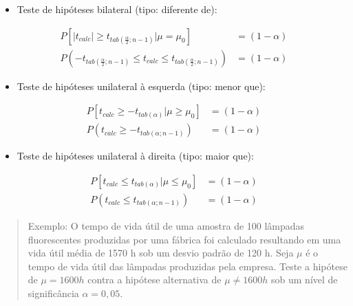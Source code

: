 \documentclass[
]{book}
\providecommand{\tightlist}{%
  \setlength{\itemsep}{0pt}\setlength{\parskip}{0pt}}
\begin{document}
\hfill\break

\begin{itemize}
\tightlist
\item
  Teste de hipóteses bilateral (tipo: diferente de):
\end{itemize}

\hfill\break

\begin{align*}
P[\left|t_{calc}\right| \ge {t}_{tab\left(\frac{\alpha }{2};n-1\right)}|\mu=\mu_{0}] & =(1-\alpha)\\
P(-{t}_{tab\left(\frac{\alpha }{2};n-1\right)} \le  t_{calc}  \le  {t}_{tab\left(\frac{\alpha }{2};n-1\right)}) & =(1-\alpha)
\end{align*}

\hfill\break

\begin{itemize}
\tightlist
\item
  Teste de hipóteses unilateral à esquerda (tipo: menor que):
\end{itemize}

\hfill\break

\begin{align*}
P[t_{calc} \ge -{t}_{tab\left(\alpha \right)}|\mu \ge \mu_{0}] & =(1-\alpha)\\  
P( t_{calc}  \ge -{t}_{tab\left(\alpha;n-1\right)}) & = (1-\alpha) 
\end{align*}

\hfill\break

\begin{itemize}
\tightlist
\item
  Teste de hipóteses unilateral à direita (tipo: maior que):
\end{itemize}

\hfill\break

\begin{align*}
P[t_{calc} \le {t}_{tab\left(\alpha \right)}|\mu \le \mu_{0}] & =(1-\alpha) \\  
P( t_{calc}  \le {t}_{tab\left(\alpha;n-1\right)} ) & = (1-\alpha) 
\end{align*}

\hfill\break

\begin{quote}
Exemplo: O tempo de vida útil de uma amostra de 100 lâmpadas fluorescentes produzidas por uma fábrica foi calculado resultando em uma vida útil média de 1570 h sob um desvio padrão de 120 h. Seja \(\mu\) é o tempo de vida útil das lâmpadas produzidas pela empresa. Teste a hipótese de \(\mu=1600 h\) contra a hipótese alternativa de \(\mu \neq 1600 h\) sob um nível de significância \(\alpha=0,05\).
\end{quote}
\end{document}
